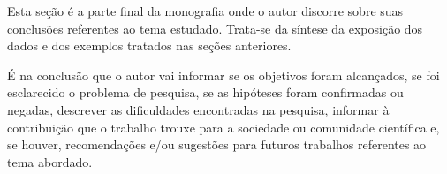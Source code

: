 Esta seção é a parte final da monografia onde o autor discorre sobre suas
conclusões referentes ao tema estudado. Trata-se da síntese da exposição dos
dados e dos exemplos tratados nas seções anteriores.

É na conclusão que o autor vai informar se os objetivos foram alcançados, se
foi esclarecido o problema de pesquisa, se as hipóteses foram confirmadas ou
negadas, descrever as dificuldades encontradas na pesquisa, informar à
contribuição que o trabalho trouxe para a sociedade ou comunidade científica
e, se houver, recomendações e/ou sugestões para futuros trabalhos referentes
ao tema abordado.

\textopadrao

\textopadrao
